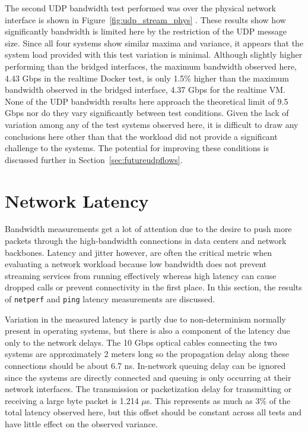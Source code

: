 The second UDP bandwidth test performed was over the physical network interface is shown in Figure~\ref{fig:udp_stream_phys} .  
These results show how significantly bandwidth is limited here by the restriction of the UDP message size.
Since all four systems show similar maxima and variance, it appears that the system load provided with this test variation is minimal.
Although slightly higher performing than the bridged interfaces, the maximum bandwidth observed here, 4.43 Gbps in the realtime Docker test, is only 1.5\% higher than the maximum bandwidth observed in the bridged interface, 4.37 Gbps for the realtime VM. 
None of the UDP bandwidth results here approach the theoretical limit of 9.5 Gbps nor do they vary significantly between test conditions.
Given the lack of variation among any of the test systems observed here, it is difficult to draw any conclusions here other than that the workload did not provide a significant challenge to the systems.
The potential for improving these conditions is discussed further in Section~\ref{sec:futureudpflows}.



\section{Network Latency} %
\label{sec:networklatency}
Bandwidth measurements get a lot of attention due to the desire to push more packets through the high-bandwidth connections in data centers and network backbones.
Latency and jitter however, are often the critical metric when evaluating a network workload because low bandwidth does not prevent streaming services from running effectively whereas high latency can cause dropped calls or prevent connectivity in the first place.
In this section, the results of \texttt{netperf} and \texttt{ping} latency measurements are discussed.  

Variation in the measured latency is partly due to non-determinism normally present in operating systems, but there is also a component of the latency due only to the network delays.
The 10 Gbps optical cables connecting the two systems are approximately 2 meters long so the propagation delay along these connections should be about 6.7 ns.
In-network queuing delay can be ignored since the systems are directly connected and queuing is only occurring at their network interfaces.
The transmission or packetization delay for transmitting or receiving a large byte packet is 1.214 $\mu$s.
This represents as much as 3\% of the total latency observed here, but this offset should be constant across all tests and have little effect on the observed variance. 


